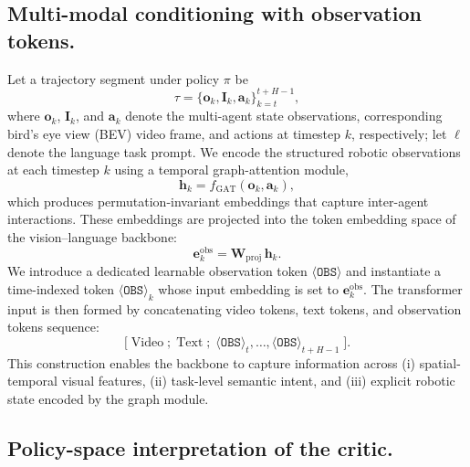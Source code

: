 \documentclass[letterpaper, 10 pt, conference]{ieeeconf}  %
\begin{document}
\subsection{Multi-modal conditioning with observation tokens.}
Let a trajectory segment under policy $\pi$ be
\[
\tau=\{\mathbf{o}_k,\mathbf{I}_k, \mathbf{a}_k\}_{k=t}^{t+H-1},
\]
where $\mathbf{o}_k$, $\mathbf{I}_k$, and $\mathbf{a}_k$ denote the multi-agent state observations, corresponding bird's eye view (BEV) video frame, and actions at timestep $k$, respectively; let $\ell$ denote the language task prompt. We encode the structured robotic observations at each timestep $k$ using a temporal graph-attention module,
\begin{equation}
\mathbf{h}_k = f_{\mathrm{GAT}}(\mathbf{o}_k, \mathbf{a}_k),
\end{equation}
which produces permutation-invariant embeddings that capture inter-agent interactions. These embeddings are projected into the token embedding space of the vision--language backbone:
\begin{equation}
\mathbf{e}^{\mathrm{obs}}_k = \mathbf{W}_{\mathrm{proj}}\,\mathbf{h}_k .
\end{equation}
We introduce a dedicated learnable observation token $\langle\texttt{OBS}\rangle$ and instantiate a time-indexed token $\langle\texttt{OBS}\rangle_k$ whose input embedding is set to $\mathbf{e}^{\mathrm{obs}}_k$. The transformer input is then formed by concatenating video tokens, text tokens, and observation tokens sequence:
\[
\Big[\; \text{Video}\; ;\; \text{Text}\; ;\; \langle\texttt{OBS}\rangle_t,\ldots,\langle\texttt{OBS}\rangle_{t+H-1} \;\Big].
\]
This construction enables the backbone to capture information across (i) spatial-temporal visual features, (ii) task-level semantic intent, and (iii) explicit robotic state  encoded by the graph module.

\subsection{Policy-space interpretation of the critic.}
\end{document}
